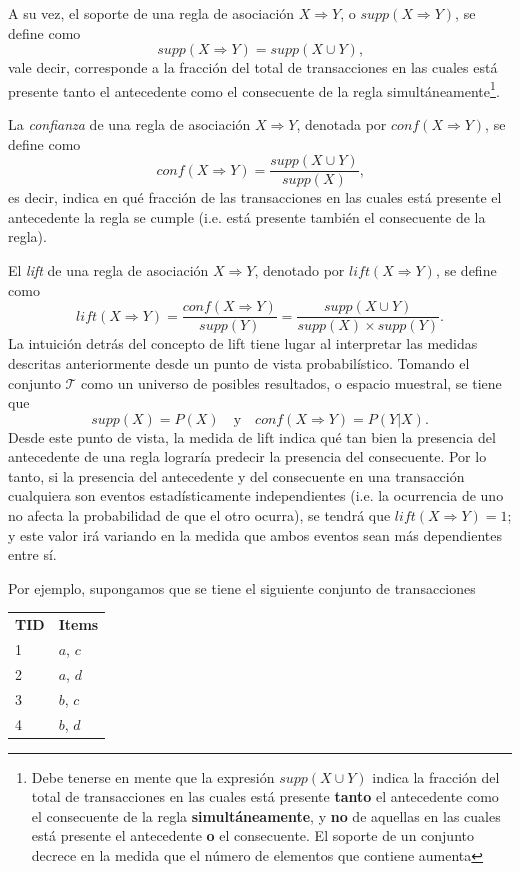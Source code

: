 A su vez, el soporte de una regla de asociación $X \Rightarrow Y$, o $\mathit{supp}(X \Rightarrow Y)$, se define como $$\mathit{supp}(X \Rightarrow Y) = \mathit{supp}(X \cup Y)\text{,}$$ vale decir, corresponde a la fracción del total de transacciones en las cuales está presente tanto el antecedente como el consecuente de la regla simultáneamente\footnote{Debe tenerse en mente que la expresión $\mathit{supp}(X \cup Y)$ indica la fracción del total de transacciones en las cuales está presente \textbf{tanto} el antecedente como el consecuente de la regla \textbf{simultáneamente}, y \textbf{no} de aquellas en las cuales está presente el antecedente \textbf{o} el consecuente. El soporte de un conjunto decrece en la medida que el número de elementos que contiene aumenta}.

La \textit{confianza} de una regla de asociación $X \Rightarrow Y$, denotada por $\mathit{conf}(X \Rightarrow Y)$, se define como $$\mathit{conf}(X \Rightarrow Y) = \frac{\mathit{supp}(X \cup Y)}{\mathit{supp}(X)}\text{,}$$ es decir, indica en qué fracción de las transacciones en las cuales está presente el antecedente la regla se cumple (i.e. está presente también el consecuente de la regla).

El \textit{lift} de una regla de asociación $X \Rightarrow Y$, denotado por $\mathit{lift}(X \Rightarrow Y)$, se define como $$\mathit{lift}(X \Rightarrow Y) = \frac{\mathit{conf}(X \Rightarrow Y)}{\mathit{supp}(Y)} = \frac{\mathit{supp}(X \cup Y)}{\mathit{supp}(X) \times \mathit{supp}(Y)}\text{.}$$ La intuición detrás del concepto de lift tiene lugar al interpretar las medidas descritas anteriormente desde un punto de vista probabilístico. Tomando el conjunto $\mathcal{T}$ como un universo de posibles resultados, o espacio muestral, se tiene que $$\mathit{supp}(X) = P(X) \quad \text{y} \quad \mathit{conf}(X \Rightarrow Y) = P(Y| X)\text{.}$$ Desde este punto de vista, la medida de lift indica qué tan bien la presencia del antecedente de una regla lograría predecir la presencia del consecuente. Por lo tanto, si la presencia del antecedente y del consecuente en una transacción cualquiera son eventos estadísticamente independientes (i.e. la ocurrencia de uno no afecta la probabilidad de que el otro ocurra), se tendrá que $\mathit{lift}(X \Rightarrow Y) = 1$; y este valor irá variando en la medida que ambos eventos sean más dependientes entre sí.

Por ejemplo, supongamos que se tiene el siguiente conjunto de transacciones

\begin{tabular}{l l}
\textbf{TID} & \textbf{Items} \\
1 & $a$, $c$ \\
2 & $a$, $d$ \\
3 & $b$, $c$ \\
4 & $b$, $d$ \\
\end{tabular}

